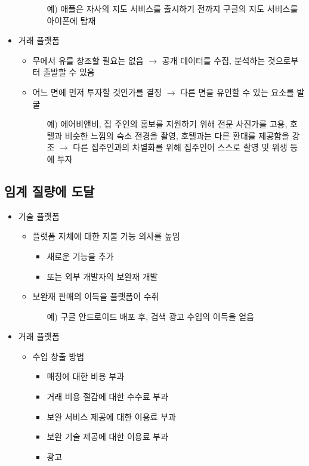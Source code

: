 \begin{itemize}
\begin{itemize}
\begin{itemize}
		\item[예)] 애플은 자사의 지도 서비스를 출시하기 전까지 구글의 지도 서비스를 아이폰에 탑재 
		\end{itemize}
	\end{itemize}
\item 거래 플랫폼
	\begin{itemize}
	\item 무에서 유를 창조할 필요는 없음 $\rightarrow$ 공개 데이터를	수집, 분석하는 것으로부터 출발할 수 있음
	\item 어느 면에 먼저 투자할 것인가를 결정 $\rightarrow$ 다른 면을 유인할 수 있는 요소를 발굴
		\begin{itemize}
		\item[예)] 에어비앤비, 집 주인의 홍보를 지원하기 위해 전문 사진가를 고용, 호텔과 비슷한 느낌의 숙소 전경을 촬영, 호텔과는 다른 환대를 제공함을 강조 $\rightarrow$ 다른 집주인과의 차별화를 위해 집주인이 스스로 촬영 및 위생 등에 투자
		\end{itemize}
	\end{itemize}
\end{itemize}

\subsection{임계 질량에 도달}
\begin{itemize}
\item 기술 플랫폼 
	\begin{itemize}
	\item 플랫폼 자체에 대한 지불 가능 의사를 높임
		\begin{itemize}
		\item 새로운 기능을 추가
		\item 또는 외부 개발자의 보완재 개발
		\end{itemize}
	\item 보완재 판매의 이득을 플랫폼이 수취
		\begin{itemize}
		\item[예)] 구글 안드로이드 배포 후, 검색 광고 수입의 이득을 얻음 
		\end{itemize}
	\end{itemize}
\item 거래 플랫폼
	\begin{itemize}
	\item 수입 창출 방법
		\begin{itemize}
		\item 매칭에 대한 비용 부과
		\item 거래 비용 절감에 대한 수수료 부과
		\item 보완 서비스 제공에 대한 이용료 부과
		\item 보완 기술 제공에 대한 이용료 부과
		\item 광고
		\end{itemize}
	\end{itemize}
\end{itemize}

